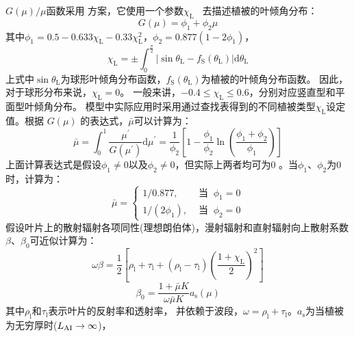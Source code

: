 $G(\mu) / \mu$函数采用 \citet{goudriaan1977crop} 方案，它使用一个参数$\chi_{\mathrm{L}}$~\citep{ross1975radiative} 去描述植被的叶倾角分布：
\begin{equation}\label{Gmu}
  G(\mu)=\phi_{1}+\phi_{2} \mu
\end{equation}
其中$\phi_{1}=0.5-0.633 \chi_{\mathrm{L}}-0.33 \chi_{\mathrm{L}}^{2}$，$\phi_{2}=0.877\left(1-2 \phi_{1}\right)$，
\begin{equation}
  \chi_{\mathrm{L}}=\pm \int_{0}^{\frac{\pi}{2}}\left|\sin \theta_{\mathrm{L}}-f_{\mathrm S}\left(\theta_{\mathrm{L}}\right)\right| {\mathrm d} \theta_{\mathrm{L}}
\end{equation}
上式中$\sin \theta_{\mathrm{L}}$为球形叶倾角分布函数，$f_{\mathrm S}\left(\theta_{\mathrm{L}}\right)$为植被的叶倾角分布函数。
因此，对于球形分布来说，$\chi_{\mathrm{L}}=0$。 一般来讲，$-0.4 \leqslant \chi_{\mathrm{L}} \leqslant 0.6$，分别对应竖直型和平面型叶倾角分布。
模型中实际应用时采用通过查找表得到的不同植被类型$\chi_{\mathrm{L}}$设定值。根据 $G(\mu)$ 的表达式，$\bar{\mu}$可以计算为：
\begin{equation}
  \bar{\mu}=\int_{0}^{1} \frac{\mu^{\prime}}{G\left(\mu^{\prime}\right)}
  {\mathrm d} \mu^{\prime}=\frac{1}{\phi_{2}}\left[1-\frac{\phi_{1}}{\phi_{2}}
  \ln \left(\frac{\phi_{1}+\phi_{2}}{\phi_{1}}\right)\right]
\end{equation}
上面计算表达式是假设$\phi_{1} \neq 0$以及$\phi_{2} \neq 0$，但实际上两者均可为0 \citep{dai2004two}。当$\phi_{1}$、$\phi_{2}$为0时，计算为：
\begin{equation}
  \bar{\mu}= \begin{cases}
    1 / 0.877, & \text { 当 }\ \phi_{1}=0 \\
    1 /\left(2 \phi_{1}\right), & \text { 当 }\ \phi_{2}=0
  \end{cases}
\end{equation}
假设叶片上的散射辐射各项同性(理想朗伯体)，漫射辐射和直射辐射向上散射系数$\beta$、$\beta_0$可近似计算为：
\begin{equation}
  \omega \beta=\frac{1}{2}\left[\rho_{\mathrm{l}}+\tau_{\mathrm{l}}+\left(\rho_{\mathrm{l}}-\tau_{\mathrm{l}}\right)\left(\frac{1+\chi_{\mathrm{L}}}{2}\right)^{2}\right]
\end{equation}
%
\begin{equation}\label{beta0}
  \beta_{0}=\frac{1+\bar{\mu} K}{\omega \bar{\mu} K} a_{\mathrm s}(\mu)
\end{equation}
其中$\rho_{\mathrm {l}}$和$\tau_{\mathrm {l}}$表示叶片的反射率和透射率，
并依赖于波段，$\omega=\rho_{\mathrm {l}}+\tau_{\mathrm {l}}$。$a_{\mathrm s}$为当植被为无穷厚时($L_{\rm AI}\rightarrow\infty$)，
